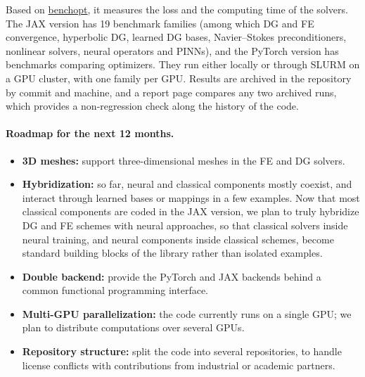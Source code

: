 \begin{itemize}
          Based on \href{https://benchopt.github.io}{benchopt}, it measures the loss and the computing time of the solvers.
          The JAX version has 19 benchmark families (among which DG and FE convergence, hyperbolic DG,
          learned DG bases, Navier--Stokes preconditioners, nonlinear solvers, neural operators and PINNs),
          and the PyTorch version has benchmarks comparing optimizers.
          They run either locally or through SLURM on a GPU cluster, with one family per GPU.
          Results are archived in the repository by commit and machine,
          and a report page compares any two archived runs,
          which provides a non-regression check along the history of the code.
\end{itemize}

\paragraph{Roadmap for the next 12 months.}
\begin{itemize}
    \item \textbf{3D meshes:} support three-dimensional meshes in the FE and DG solvers.
    \item \textbf{Hybridization:} so far, neural and classical components mostly coexist,
          and interact through learned bases or mappings in a few examples.
          Now that most classical components are coded in the JAX version,
          we plan to truly hybridize DG and FE schemes with neural approaches,
          so that classical solvers inside neural training,
          and neural components inside classical schemes,
          become standard building blocks of the library rather than isolated examples.
    \item \textbf{Double backend:} provide the PyTorch and JAX backends
          behind a common functional programming interface.
    \item \textbf{Multi-GPU parallelization:} the code currently runs on a single GPU;
          we plan to distribute computations over several GPUs.
    \item \textbf{Repository structure:} split the code into several repositories,
          to handle license conflicts with contributions from industrial or academic partners.
\end{itemize}

